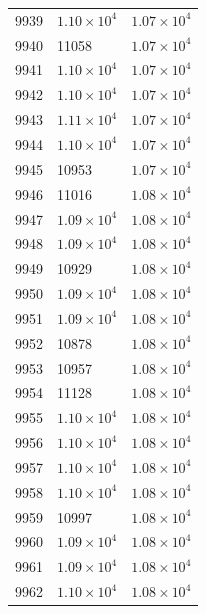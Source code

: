 \begin{table}[H]
\begin{tabular}{lll}
9939 & $\displaystyle 1.10 \times 10^{4}$ & $\displaystyle 1.07 \times 10^{4}$ \\
9940 & 11058 & $\displaystyle 1.07 \times 10^{4}$ \\
9941 & $\displaystyle 1.10 \times 10^{4}$ & $\displaystyle 1.07 \times 10^{4}$ \\
9942 & $\displaystyle 1.10 \times 10^{4}$ & $\displaystyle 1.07 \times 10^{4}$ \\
9943 & $\displaystyle 1.11 \times 10^{4}$ & $\displaystyle 1.07 \times 10^{4}$ \\
9944 & $\displaystyle 1.10 \times 10^{4}$ & $\displaystyle 1.07 \times 10^{4}$ \\
9945 & 10953 & $\displaystyle 1.07 \times 10^{4}$ \\
9946 & 11016 & $\displaystyle 1.08 \times 10^{4}$ \\
9947 & $\displaystyle 1.09 \times 10^{4}$ & $\displaystyle 1.08 \times 10^{4}$ \\
9948 & $\displaystyle 1.09 \times 10^{4}$ & $\displaystyle 1.08 \times 10^{4}$ \\
9949 & 10929 & $\displaystyle 1.08 \times 10^{4}$ \\
9950 & $\displaystyle 1.09 \times 10^{4}$ & $\displaystyle 1.08 \times 10^{4}$ \\
9951 & $\displaystyle 1.09 \times 10^{4}$ & $\displaystyle 1.08 \times 10^{4}$ \\
9952 & 10878 & $\displaystyle 1.08 \times 10^{4}$ \\
9953 & 10957 & $\displaystyle 1.08 \times 10^{4}$ \\
9954 & 11128 & $\displaystyle 1.08 \times 10^{4}$ \\
9955 & $\displaystyle 1.10 \times 10^{4}$ & $\displaystyle 1.08 \times 10^{4}$ \\
9956 & $\displaystyle 1.10 \times 10^{4}$ & $\displaystyle 1.08 \times 10^{4}$ \\
9957 & $\displaystyle 1.10 \times 10^{4}$ & $\displaystyle 1.08 \times 10^{4}$ \\
9958 & $\displaystyle 1.10 \times 10^{4}$ & $\displaystyle 1.08 \times 10^{4}$ \\
9959 & 10997 & $\displaystyle 1.08 \times 10^{4}$ \\
9960 & $\displaystyle 1.09 \times 10^{4}$ & $\displaystyle 1.08 \times 10^{4}$ \\
9961 & $\displaystyle 1.09 \times 10^{4}$ & $\displaystyle 1.08 \times 10^{4}$ \\
9962 & $\displaystyle 1.10 \times 10^{4}$ & $\displaystyle 1.08 \times 10^{4}$ \\

\end{tabular}
\end{table}
